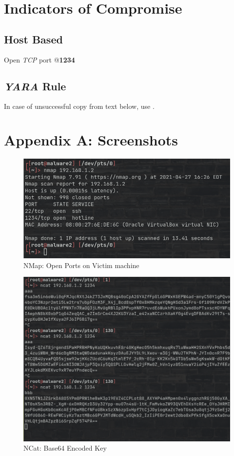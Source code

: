 \documentclass[10pt,a4paper]{article}
\begin{document}
\section{Indicators of Compromise}
	\subsection{Host Based}
	Open \textit{TCP} port @\textbf{1234}

	\subsection{\textit{YARA} Rule}
	In case of unsuccessful copy from text below, use \cite{yara}.
		

\newpage
\section{Appendix A: Screenshots}
\begin{figure}[!htbp]%
	\centering
	\includegraphics[width=\columnwidth]{pics/openPort.png}
	\caption{NMap: Open Ports on Victim machine}
	\label{ports}
\end{figure}

\begin{figure}[!htbp]%
	\centering
	\includegraphics[width=\columnwidth]{pics/dhbegin.png}
	\caption{NCat: Base64 Encoded Key}
	\label{pubkey}
\end{figure}

\printbibliography
\end{document}
